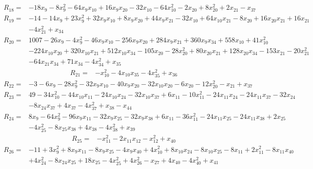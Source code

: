 \begin{align*}
R_{18}={}&-18x_{9}-8x_{9}^{2}-64x_{9}x_{10}+16x_{9}x_{20}-32x_{10}-64x_{10}^{2}-2x_{20}+8x_{20}^{2}+2x_{21}-x_{37}
\end{align*}
\begin{align*}
R_{19}={}&-14-14x_{9}+23x_{9}^{2}+32x_{9}x_{10}+8x_{9}x_{20}+44x_{9}x_{21}-32x_{10}+64x_{10}x_{21}-8x_{20}+16x_{20}x_{21}+16x_{21}\\
{}&-4x_{21}^{2}+x_{34}
\end{align*}
\begin{align*}
R_{20}={}&1007-26x_{9}-4x_{9}^{2}-46x_{9}x_{10}-256x_{9}x_{20}+284x_{9}x_{21}+360x_{9}x_{34}+558x_{10}+41x_{10}^{2}\\
{}&-224x_{10}x_{20}+320x_{10}x_{21}+512x_{10}x_{34}-105x_{20}-28x_{20}^{2}+80x_{20}x_{21}+128x_{20}x_{34}-153x_{21}-20x_{21}^{2}\\
{}&-64x_{21}x_{34}+71x_{34}-4x_{34}^{2}+x_{35}
\end{align*}
\begin{align*}
R_{21}={}&-x_{10}^{2}-4x_{10}x_{35}-4x_{35}^{2}+x_{36}
\end{align*}
\begin{align*}
R_{22}={}&-3-6x_{9}-28x_{9}^{2}-32x_{9}x_{10}-40x_{9}x_{20}-32x_{10}x_{20}-6x_{20}-12x_{20}^{2}-x_{21}+x_{37}
\end{align*}
\begin{align*}
R_{23}={}&49-34x_{10}^{2}-44x_{10}x_{11}-24x_{10}x_{24}-32x_{10}x_{37}+6x_{11}-10x_{11}^{2}-24x_{11}x_{24}-24x_{11}x_{37}-32x_{24}\\
{}&-8x_{24}x_{37}+4x_{37}-4x_{37}^{2}+x_{38}-x_{44}
\end{align*}
\begin{align*}
R_{24}={}&8x_{9}-64x_{9}^{2}-96x_{9}x_{11}-32x_{9}x_{25}-32x_{9}x_{38}+6x_{11}-36x_{11}^{2}-24x_{11}x_{25}-24x_{11}x_{38}+2x_{25}\\
{}&-4x_{25}^{2}-8x_{25}x_{38}+4x_{38}-4x_{38}^{2}+x_{39}
\end{align*}
\begin{align*}
R_{25}={}&-x_{11}^{2}-2x_{11}x_{12}-x_{12}^{2}+x_{40}
\end{align*}
\begin{align*}
R_{26}={}&-11+3x_{9}^{2}+8x_{9}x_{11}-8x_{9}x_{25}-4x_{9}x_{40}+4x_{10}^{2}+8x_{10}x_{24}-8x_{10}x_{25}-8x_{11}+2x_{11}^{2}-8x_{11}x_{40}\\
{}&+4x_{24}^{2}-8x_{24}x_{25}+18x_{25}-4x_{25}^{2}+4x_{26}^{2}-x_{27}+4x_{40}-4x_{40}^{2}+x_{41}
\end{align*}
